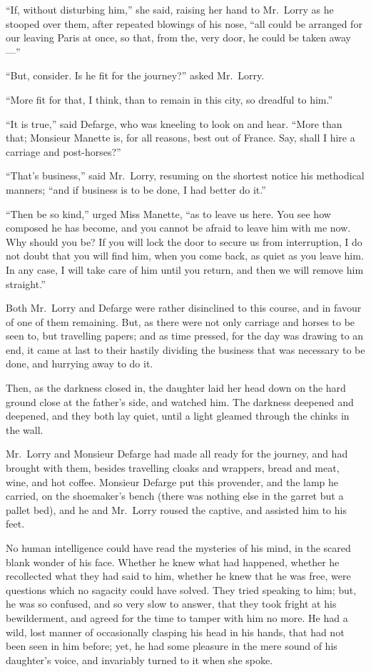 ``If, without disturbing him,'' she said, raising her hand to Mr.\ Lorry
as he stooped over them, after repeated blowings of his nose, ``all
could be arranged for our leaving Paris at once, so that, from the,
very door, he could be taken away---''

``But, consider.  Is he fit for the journey?'' asked Mr.\ Lorry.

``More fit for that, I think, than to remain in this city, so dreadful to him.''

``It is true,'' said Defarge, who was kneeling to look on and hear.
``More than that; Monsieur Manette is, for all reasons, best out of
France.  Say, shall I hire a carriage and post-horses?''

``That's business,'' said Mr.\ Lorry, resuming on the shortest notice
his methodical manners; ``and if business is to be done, I had better do it.''

``Then be so kind,'' urged Miss Manette, ``as to leave us here.  You see
how composed he has become, and you cannot be afraid to leave him
with me now.  Why should you be?  If you will lock the door to secure
us from interruption, I do not doubt that you will find him, when you
come back, as quiet as you leave him.  In any case, I will take care
of him until you return, and then we will remove him straight.''

Both Mr.\ Lorry and Defarge were rather disinclined to this course,
and in favour of one of them remaining.  But, as there were not only
carriage and horses to be seen to, but travelling papers; and as time
pressed, for the day was drawing to an end, it came at last to their
hastily dividing the business that was necessary to be done, and
hurrying away to do it.

Then, as the darkness closed in, the daughter laid her head down on
the hard ground close at the father's side, and watched him.  The
darkness deepened and deepened, and they both lay quiet, until a
light gleamed through the chinks in the wall.

Mr.\ Lorry and Monsieur Defarge had made all ready for the journey,
and had brought with them, besides travelling cloaks and wrappers,
bread and meat, wine, and hot coffee.  Monsieur Defarge put this
provender, and the lamp he carried, on the shoemaker's bench (there
was nothing else in the garret but a pallet bed), and he and
Mr.\ Lorry roused the captive, and assisted him to his feet.

No human intelligence could have read the mysteries of his mind, in
the scared blank wonder of his face.  Whether he knew what had
happened, whether he recollected what they had said to him, whether
he knew that he was free, were questions which no sagacity could have
solved.  They tried speaking to him; but, he was so confused, and so
very slow to answer, that they took fright at his bewilderment, and
agreed for the time to tamper with him no more.  He had a wild, lost
manner of occasionally clasping his head in his hands, that had not
been seen in him before; yet, he had some pleasure in the mere sound
of his daughter's voice, and invariably turned to it when she spoke.

